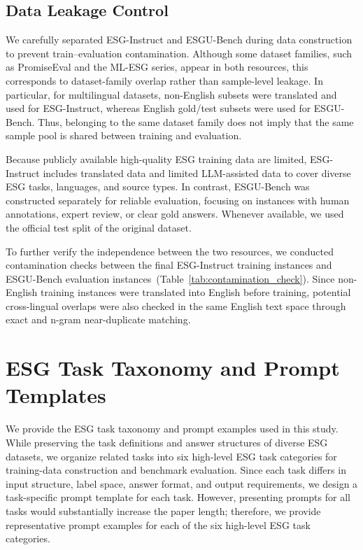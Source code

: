 \documentclass[11pt]{article}
\begin{document}
\subsection{Data Leakage Control}
\label{app:data_leakage}
We carefully separated \textsf{ESG-Instruct} and \textsf{ESGU-Bench} during data construction to prevent train--evaluation contamination. 
Although some dataset families, such as PromiseEval and the ML-ESG series, appear in both resources, this corresponds to dataset-family overlap rather than sample-level leakage. 
In particular, for multilingual datasets, non-English subsets were translated and used for \textsf{ESG-Instruct}, whereas English gold/test subsets were used for \textsf{ESGU-Bench}. 
Thus, belonging to the same dataset family does not imply that the same sample pool is shared between training and evaluation.

Because publicly available high-quality ESG training data are limited, \textsf{ESG-Instruct} includes translated data and limited LLM-assisted data to cover diverse ESG tasks, languages, and source types. 
In contrast, \textsf{ESGU-Bench} was constructed separately for reliable evaluation, focusing on instances with human annotations, expert review, or clear gold answers. 
Whenever available, we used the official test split of the original dataset.

To further verify the independence between the two resources, we conducted contamination checks between the final \textsf{ESG-Instruct} training instances and \textsf{ESGU-Bench} evaluation instances~(Table~\ref{tab:contamination_check}). 
Since non-English training instances were translated into English before training, potential cross-lingual overlaps were also checked in the same English text space through exact and n-gram near-duplicate matching.

\section{ESG Task Taxonomy and Prompt Templates}
\label{app:task_taxonomy_prompt}
We provide the ESG task taxonomy and prompt examples used in this study. While preserving the task definitions and answer structures of diverse ESG datasets, we organize related tasks into six high-level ESG task categories for training-data construction and benchmark evaluation. Since each task differs in input structure, label space, answer format, and output requirements, we design a task-specific prompt template for each task. However, presenting prompts for all tasks would substantially increase the paper length; therefore, we provide representative prompt examples for each of the six high-level ESG task categories.
\end{document}
